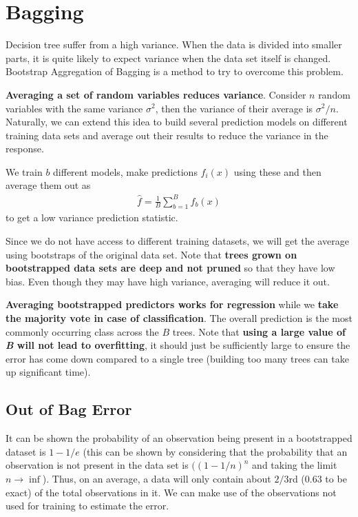 \documentclass[../statistical_learning_notes.tex]{subfiles}
\begin{document}
    \section{Bagging}
    Decision tree suffer from a high variance. When the data is divided into smaller parts, it is quite likely to expect variance when the data set itself is changed. Bootstrap Aggregation of Bagging is a method to try to overcome this problem.\newline

    \textbf{Averaging a set of random variables reduces variance}. Consider $n$ random variables with the same variance $\sigma^{2}$, then the variance of their average is $\sigma^{2}/n$. Naturally, we can extend this idea to build several prediction models on different training data sets and average out their results to reduce the variance in the response.\newline

    We train $b$ different models, make predictions $\hat{f}_{i}(x)$ using these and then average them out as
    \begin{align*}
        \hat{f} = \frac{1}{B}\sum_{b=1}^{B} \hat{f}_{b}(x)
    \end{align*}
    to get a low variance prediction statistic.\newline

    Since we do not have access to different training datasets, we will get the average using bootstraps of the original data set. Note that \textbf{trees grown on bootstrapped data sets are deep and not pruned} so that they have low bias. Even though they may have high variance, averaging will reduce it out.\newline

    \textbf{Averaging bootstrapped predictors works for regression} while we \textbf{take the majority vote in case of classification}. The overall prediction is the most commonly occurring class across the $B$ trees. Note that \textbf{using a large value of \emph{B} will not lead to overfitting}, it should just be sufficiently large to ensure the error has come down compared to a single tree (building too many trees can take up significant time).
    

    \subsection{Out of Bag Error}
    It can be shown the probability of an observation being present in a bootstrapped dataset is $1 - 1/e$ (this can be shown by considering that the probability that an observation is not present in the data set is $((1 - 1/n)^{n}$ and taking the limit $n \to \inf$). Thus, on an average, a data will only contain about $2/3$rd ($0.63$ to be exact) of the total observations in it. We can make use of the observations not used for training to estimate the error.\newline
\end{document}
